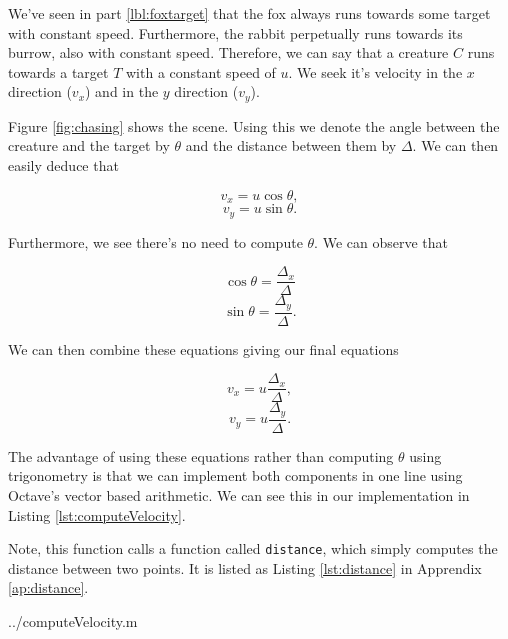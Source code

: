We've seen in part \ref{lbl:foxtarget} that the fox always runs towards some target with constant speed. Furthermore, the rabbit perpetually runs towards its burrow, also with constant speed. Therefore, we can say that a creature $C$ runs towards a target $T$ with a constant speed of $u$. We seek it's velocity in the $x$ direction ($v_x$) and in the $y$ direction ($v_y$).





Figure \ref{fig:chasing} shows the scene. Using this we denote the angle between the creature and the target by $\theta$ and the distance between them by $\Delta$. We can then easily deduce that

$$ v_x = u\cos{\theta}, $$
$$ v_y = u\sin{\theta}. $$

Furthermore, we see there's no need to compute $\theta$. We can observe that 

$$ \cos{\theta} = \frac{\Delta_x}{\Delta}$$
$$ \sin{\theta} = \frac{\Delta_y}{\Delta}.$$

We can then combine these equations giving our final equations

$$ v_x = u \frac{\Delta_x}{\Delta},$$
$$ v_y = u \frac{\Delta_y}{\Delta}.$$

The advantage of using these equations rather than computing $\theta$ using trigonometry is that we can implement both components in one line using Octave's vector based arithmetic. We can see this in our implementation in Listing \ref{lst:computeVelocity}.

Note, this function calls a function called \texttt{distance}, which simply computes the distance between two points. It is listed as Listing \ref{lst:distance} in Apprendix \ref{ap:distance}.

  {../computeVelocity.m}
